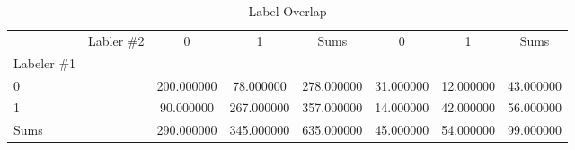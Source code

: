 \begin{table}
\caption{Label Overlap}
\label{tab:label_overlap}
\begin{tabular}{llcc|c||cc|c}
\toprule
 & Labler \#2 & 0 & 1 & Sums & 0 & 1 & Sums \\
Labeler \#1 &  &  &  &  &  &  &  \\
\midrule
0 &  & 200.000000 & 78.000000 & 278.000000 & 31.000000 & 12.000000 & 43.000000 \\
1 &  & 90.000000 & 267.000000 & 357.000000 & 14.000000 & 42.000000 & 56.000000 \\
Sums &  & 290.000000 & 345.000000 & 635.000000 & 45.000000 & 54.000000 & 99.000000 \\
\bottomrule
\end{tabular}
\end{table}

